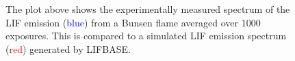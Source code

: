 \begin{figure}

\centering



\caption[Spectrum of the CH LIF emission]{The plot above shows the experimentally measured spectrum of the LIF emission (\textcolor{blue}{blue}) from a Bunsen flame averaged over 1000 exposures. This is compared to a simulated LIF emission spectrum (\textcolor{red}{red}) generated by LIFBASE.}

\label{fig:chPLIFSpectrum}

\end{figure}

